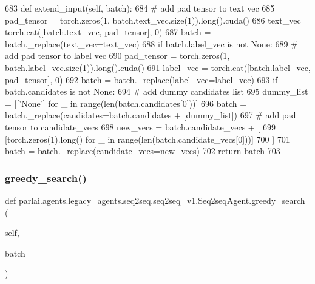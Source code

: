 \begin{DoxyCode}
683     \textcolor{keyword}{def }extend\_input(self, batch):
684         \textcolor{comment}{# add pad tensor to text vec}
685         pad\_tensor = torch.zeros(1, batch.text\_vec.size(1)).long().cuda()
686         text\_vec = torch.cat([batch.text\_vec, pad\_tensor], 0)
687         batch = batch.\_replace(text\_vec=text\_vec)
688         \textcolor{keywordflow}{if} batch.label\_vec \textcolor{keywordflow}{is} \textcolor{keywordflow}{not} \textcolor{keywordtype}{None}:
689             \textcolor{comment}{# add pad tensor to label vec}
690             pad\_tensor = torch.zeros(1, batch.label\_vec.size(1)).long().cuda()
691             label\_vec = torch.cat([batch.label\_vec, pad\_tensor], 0)
692             batch = batch.\_replace(label\_vec=label\_vec)
693         \textcolor{keywordflow}{if} batch.candidates \textcolor{keywordflow}{is} \textcolor{keywordflow}{not} \textcolor{keywordtype}{None}:
694             \textcolor{comment}{# add dummy candidates list}
695             dummy\_list = [[\textcolor{stringliteral}{'None'}] \textcolor{keywordflow}{for} \_ \textcolor{keywordflow}{in} range(len(batch.candidates[0]))]
696             batch = batch.\_replace(candidates=batch.candidates + [dummy\_list])
697             \textcolor{comment}{# add pad tensor to candidate\_vecs}
698             new\_vecs = batch.candidate\_vecs + [
699                 [torch.zeros(1).long() \textcolor{keywordflow}{for} \_ \textcolor{keywordflow}{in} range(len(batch.candidate\_vecs[0]))]
700             ]
701             batch = batch.\_replace(candidate\_vecs=new\_vecs)
702         \textcolor{keywordflow}{return} batch
703 
\end{DoxyCode}
\mbox{\label{classparlai_1_1agents_1_1legacy__agents_1_1seq2seq_1_1seq2seq__v1_1_1Seq2seqAgent_a6afc143cc0ec59803be416416ce1ec97}} 
\subsubsection{\texorpdfstring{greedy\+\_\+search()}{greedy\_search()}}
{\footnotesize\ttfamily def parlai.\+agents.\+legacy\+\_\+agents.\+seq2seq.\+seq2seq\+\_\+v1.\+Seq2seq\+Agent.\+greedy\+\_\+search (\begin{DoxyParamCaption}\item[{}]{self,  }\item[{}]{batch }\end{DoxyParamCaption})}



